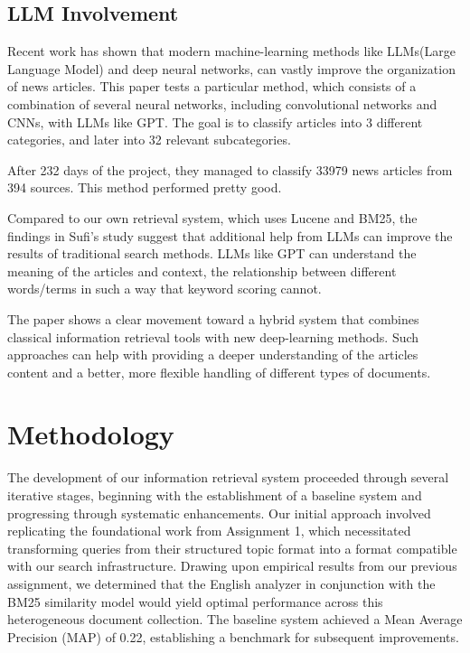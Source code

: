 \documentclass[sigplan,screen,nonacm]{acmart}
\begin{document}
\subsection{LLM Involvement}
Recent work has shown that modern machine-learning methods like LLMs(Large Language Model) and deep neural networks, can vastly improve the organization of news articles\cite{Sufi2024}. 
This paper tests a particular method, which consists of a combination of several neural networks, including convolutional networks and CNNs, with LLMs like GPT. The goal is to classify articles into 3 different categories, and later into 32 relevant subcategories. 

After 232 days of the project, they managed to classify 33979 news articles from 394 sources. This method performed pretty good\cite{Sufi2024}. 

Compared to our own retrieval system, which uses Lucene and BM25, the findings in Sufi’s study suggest that additional help from LLMs can improve the results of traditional search methods. LLMs like GPT can understand the meaning of the articles and context, the relationship between different words/terms in such a way that keyword scoring cannot. 

The paper shows a clear movement toward a hybrid system that combines classical information retrieval tools with new deep-learning methods. Such approaches can help with providing a deeper understanding of the articles content and a better, more flexible handling of different types of documents\cite{Sufi2024}.

\section{Methodology}

The development of our information retrieval system proceeded through several iterative stages, beginning with the establishment of a baseline system and progressing through systematic enhancements. Our initial approach involved replicating the foundational work from Assignment 1, which necessitated transforming queries from their structured topic format into a format compatible with our search infrastructure. Drawing upon empirical results from our previous assignment, we determined that the English analyzer in conjunction with the BM25 similarity model would yield optimal performance across this heterogeneous document collection. The baseline system achieved a Mean Average Precision (MAP) of 0.22, establishing a benchmark for subsequent improvements.
\end{document}
